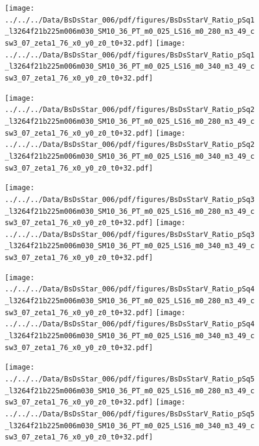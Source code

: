 \documentclass[a4paper,10pt]{article}
\begin{document}
\begin{figure}[p]
 \texttt{[image: ../../../Data/BsDsStar\_006/pdf/figures/BsDsStarV\_Ratio\_pSq1\_l3264f21b225m006m030\_SM10\_36\_PT\_m0\_025\_LS16\_m0\_280\_m3\_49\_csw3\_07\_zeta1\_76\_x0\_y0\_z0\_t0+32.pdf]} 
 \texttt{[image: ../../../Data/BsDsStar\_006/pdf/figures/BsDsStarV\_Ratio\_pSq1\_l3264f21b225m006m030\_SM10\_36\_PT\_m0\_025\_LS16\_m0\_340\_m3\_49\_csw3\_07\_zeta1\_76\_x0\_y0\_z0\_t0+32.pdf]} 
 \end{figure}
\begin{figure}[p]
 \texttt{[image: ../../../Data/BsDsStar\_006/pdf/figures/BsDsStarV\_Ratio\_pSq2\_l3264f21b225m006m030\_SM10\_36\_PT\_m0\_025\_LS16\_m0\_280\_m3\_49\_csw3\_07\_zeta1\_76\_x0\_y0\_z0\_t0+32.pdf]} 
 \texttt{[image: ../../../Data/BsDsStar\_006/pdf/figures/BsDsStarV\_Ratio\_pSq2\_l3264f21b225m006m030\_SM10\_36\_PT\_m0\_025\_LS16\_m0\_340\_m3\_49\_csw3\_07\_zeta1\_76\_x0\_y0\_z0\_t0+32.pdf]} 
 \end{figure}
\begin{figure}[p]
 \texttt{[image: ../../../Data/BsDsStar\_006/pdf/figures/BsDsStarV\_Ratio\_pSq3\_l3264f21b225m006m030\_SM10\_36\_PT\_m0\_025\_LS16\_m0\_280\_m3\_49\_csw3\_07\_zeta1\_76\_x0\_y0\_z0\_t0+32.pdf]} 
 \texttt{[image: ../../../Data/BsDsStar\_006/pdf/figures/BsDsStarV\_Ratio\_pSq3\_l3264f21b225m006m030\_SM10\_36\_PT\_m0\_025\_LS16\_m0\_340\_m3\_49\_csw3\_07\_zeta1\_76\_x0\_y0\_z0\_t0+32.pdf]} 
 \end{figure}
\clearpage
\begin{figure}[p]
 \texttt{[image: ../../../Data/BsDsStar\_006/pdf/figures/BsDsStarV\_Ratio\_pSq4\_l3264f21b225m006m030\_SM10\_36\_PT\_m0\_025\_LS16\_m0\_280\_m3\_49\_csw3\_07\_zeta1\_76\_x0\_y0\_z0\_t0+32.pdf]} 
 \texttt{[image: ../../../Data/BsDsStar\_006/pdf/figures/BsDsStarV\_Ratio\_pSq4\_l3264f21b225m006m030\_SM10\_36\_PT\_m0\_025\_LS16\_m0\_340\_m3\_49\_csw3\_07\_zeta1\_76\_x0\_y0\_z0\_t0+32.pdf]} 
 \end{figure}
\begin{figure}[p]
 \texttt{[image: ../../../Data/BsDsStar\_006/pdf/figures/BsDsStarV\_Ratio\_pSq5\_l3264f21b225m006m030\_SM10\_36\_PT\_m0\_025\_LS16\_m0\_280\_m3\_49\_csw3\_07\_zeta1\_76\_x0\_y0\_z0\_t0+32.pdf]} 
 \texttt{[image: ../../../Data/BsDsStar\_006/pdf/figures/BsDsStarV\_Ratio\_pSq5\_l3264f21b225m006m030\_SM10\_36\_PT\_m0\_025\_LS16\_m0\_340\_m3\_49\_csw3\_07\_zeta1\_76\_x0\_y0\_z0\_t0+32.pdf]} 
 \end{figure}
\clearpage
\end{document}
